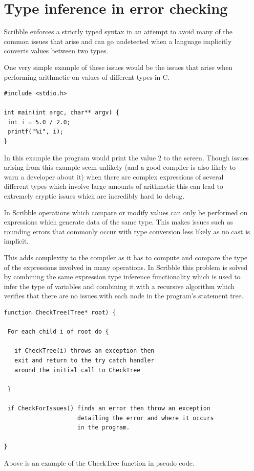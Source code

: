 \documentclass[]{final_report}
\begin{document}
\section{Type inference in error checking}

Scribble enforces a strictly typed syntax in an attempt to avoid many of the common issues that arise and can go undetected when a language implicitly converts values between two types.

One very simple example of these issues would be the issues that arise when performing arithmetic on values of different types in C.

\begin{verbatim}
#include <stdio.h>

int main(int argc, char** argv) {
 int i = 5.0 / 2.0;
 printf("%i", i);
}
\end{verbatim}

In this example the program would print the value 2 to the screen. Though issues arising from this example seem unlikely (and a good compiler is also likely to warn a developer about it) when there are complex expressions of several different types which involve large amounts of arithmetic this can lead to extremely cryptic issues which are incredibly hard to debug.

In Scribble operations which compare or modify values can only be performed on expressions which generate data of the same type. This makes issues such as rounding errors that commonly occur with type conversion less likely as no cast is implicit. 

This adds complexity to the compiler as it has to compute and compare the type of the expressions involved in many operations. In Scribble this problem is solved by combining the same expression type inference functionality which is used to infer the type of variables and combining it with a recursive algorithm which verifies that there are no issues with each node in the program's statement tree.

\begin{verbatim}
function CheckTree(Tree* root) {
 
 For each child i of root do {

   if CheckTree(i) throws an exception then 
   exit and return to the try catch handler 
   around the initial call to CheckTree
   
 }
 
 if CheckForIssues() finds an error then throw an exception 
 					 detailing the error and where it occurs 
 					 in the program.

}
\end{verbatim}
Above is an example of the CheckTree function in pseudo code.
\end{document}
